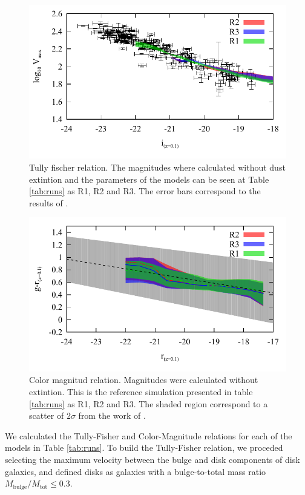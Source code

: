 \documentclass[usenatbib]{mn2e}
\begin{document}
\begin{figure}
\centering
 \includegraphics[scale=0.68]{figures/tests/T_F-disk-velmax.pdf}
\caption{ Tully fischer relation. The magnitudes where calculated
  without dust extintion and the parameters of the models can be seen
  at Table \ref{tab:runs}  as R1, R2 and R3. The error bars correspond
  to the results of \citet{2007AJ....134..945P}.\label{fig:T-F-diagram}} 
\end{figure}
\begin{figure}
\centering
 \includegraphics[scale=0.68]{figures/tests/Color_Mag.pdf}
\caption{ Color magnitud relation. Magnitudes were calculated without
  extintion. This is the reference simulation presented in table
  \ref{tab:runs}  as R1, R2 and R3. The shaded region correspond to a
  scatter of  $2\sigma$ from the work  of
  \citet{2012MNRAS.423.1583M}.\label{fig:CM-diagram}} 
\end{figure}

We calculated the Tully-Fisher and Color-Magnitude relations for each
of the models in Table \ref{tab:runs}.  To build the Tully-Fisher
relation, we proceded selecting the maximum velocity between the
bulge and disk components of disk galaxies, and defined disks as
galaxies  with a bulge-to-total mass ratio
$M_{\text{bulge}}/M_{\text{tot}}\le 0.3$.  
\end{document}
